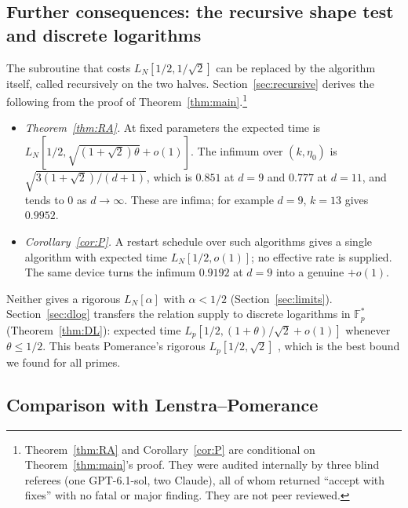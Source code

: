 \documentclass[11pt]{amsart}
\theoremstyle{definition}
\newcommand{\F}{\mathbb{F}}
\begin{document}
\subsection{Further consequences: the recursive shape test and discrete logarithms}
The subroutine that costs $L_N[1/2,1/\sqrt2]$ can be replaced by the algorithm itself, called recursively on the two halves. Section~\ref{sec:recursive}
derives the following from the proof of Theorem~\ref{thm:main}.\footnote{Theorem~\ref{thm:RA} and Corollary~\ref{cor:P} are conditional on
Theorem~\ref{thm:main}'s proof. They were audited internally by three blind referees (one GPT-6.1-sol, two Claude), all of whom returned
``accept with fixes'' with no fatal or major finding. They are not peer reviewed.}
\begin{itemize}
\item \emph{Theorem~\ref{thm:RA}.} At fixed parameters the expected time is $L_N[1/2,\sqrt{(1+\sqrt2)\theta}+o(1)]$. The infimum over $(k,\eta_0)$ is
  $\sqrt{3(1+\sqrt2)/(d+1)}$, which is $0.851$ at $d=9$ and $0.777$ at $d=11$, and tends to $0$ as $d\to\infty$. These are infima; for example
  $d=9$, $k=13$ gives $0.9952$.
\item \emph{Corollary~\ref{cor:P}.} A restart schedule over such algorithms gives a single algorithm with expected time
  $L_N[1/2,o(1)]$; no effective rate is supplied. The same device turns the infimum $0.9192$ at $d=9$ into a genuine $+o(1)$.
\end{itemize}
Neither gives a rigorous $L_N[\alpha]$ with $\alpha<1/2$ (Section~\ref{sec:limits}). Section~\ref{sec:dlog} transfers the relation supply to
discrete logarithms in $\F_p^*$ (Theorem~\ref{thm:DL}): expected time $L_p[1/2,(1+\theta)/\sqrt2+o(1)]$ whenever $\theta\le1/2$. This beats Pomerance's
rigorous $L_p[1/2,\sqrt2]$ \cite{pomerance1987}, which is the best bound we found for all primes.

\subsection{Comparison with Lenstra--Pomerance}
\end{document}
